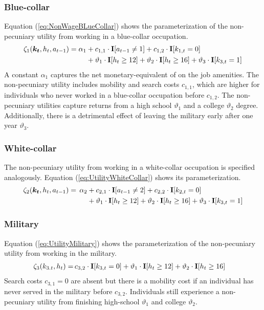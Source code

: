 \subsubsection*{Blue-collar}
\noindent Equation (\ref{eq:NonWageBLueCollar}) shows the parameterization of the non-pecuniary utility from working in a blue-collar occupation.
%
\begin{align}\label{eq:NonWageBLueCollar}
\zeta_{1}(\bm{k_t}, h_t, a_{t-1})  = \alpha_1  &+ c_{1,1} \cdot {\textbf{I}}[a_{t-1} \neq 1] + c_{1,2} \cdot {\textbf{I}}[k_{1,t} = 0] \\ \nonumber
                            & + \vartheta_1 \cdot {\textbf{I}}[h_t \geq 12] + \vartheta_2 \cdot {\textbf{I}}[h_t \geq 16] + \vartheta_3 \cdot {\textbf{I}}[k_{3,t} = 1]
\end{align}
%
A constant $\alpha_1$ captures the net monetary-equivalent of on the job amenities. The non-pecuniary utility includes mobility and search costs $c_{1,1}$, which are higher for individuals who never worked in a blue-collar occupation before $c_{1,2}$. The non-pecuniary utilities capture returns from a high school $\vartheta_1$ and a college $\vartheta_2$ degree. Additionally, there is a detrimental effect of leaving the military early after one year $\vartheta_3$.
\subsubsection*{White-collar}
The non-pecuniary utility from working in a white-collar occupation is specified analogously. Equation (\ref{eq:UtilityWhiteCollar}) shows its parameterization.
%
\begin{align}\label{eq:UtilityWhiteCollar}
\zeta_{2}( \bm{k_t}, h_t, a_{t-1} ) = \,\alpha_2 & + c_{2,1} \cdot {\textbf{I}}[a_{t-1} \neq 2] + c_{2,2} \cdot {\textbf{I}}[k_{2,t} = 0]\\\nonumber
                            & + \vartheta_1 \cdot {\textbf{I}}[h_t \geq 12] + \vartheta_2 \cdot {\textbf{I}}[h_t \geq 16] + \vartheta_3 \cdot {\textbf{I}}[k_{3,t} = 1]
\end{align}
\subsubsection*{Military}
\noindent Equation (\ref{eq:UtilityMilitary}) shows the parameterization of the non-pecuniary utility from working in the military.
%
\begin{align}\label{eq:UtilityMilitary}
\zeta_{3}( k_{3.t}, h_t)  = \,& c_{3,2} \cdot {\textbf{I}}[k_{3,t} = 0]+ \vartheta_1 \cdot {\textbf{I}}[h_t \geq 12] + \vartheta_2 \cdot {\textbf{I}}[h_t \geq 16]
\end{align}
%
Search costs $c_{3, 1} = 0$ are absent but there is a mobility cost if an individual has never served in the military before $c_{3,2}$. Individuals still experience a non-pecuniary utility from finishing high-school $\vartheta_1$ and college $\vartheta_2$.
